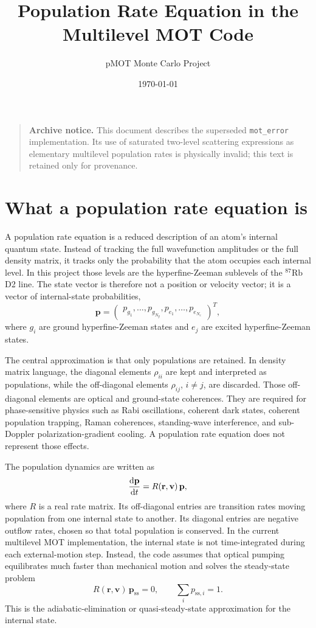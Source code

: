 \documentclass[11pt]{article}
\title{Population Rate Equation in the Multilevel MOT Code}
\author{pMOT Monte Carlo Project}
\date{\today}
\begin{document}
\maketitle

\begin{quote}
\textbf{Archive notice.} This document describes the superseded
\texttt{mot\_error} implementation. Its use of saturated two-level scattering
expressions as elementary multilevel population rates is physically invalid;
this text is retained only for provenance.
\end{quote}

\section{What a population rate equation is}

A population rate equation is a reduced description of an atom's internal
quantum state.  Instead of tracking the full wavefunction amplitudes or the
full density matrix, it tracks only the probability that the atom occupies each
internal level.  In this project those levels are the hyperfine-Zeeman sublevels
of the \({}^{87}\mathrm{Rb}\) D2 line.  The state vector is therefore not a
position or velocity vector; it is a vector of internal-state probabilities,
\[
    \mathbf p =
    \begin{pmatrix}
    p_{g_1}, \ldots, p_{g_{N_g}},
    p_{e_1}, \ldots, p_{e_{N_e}}
    \end{pmatrix}^{T},
\]
where \(g_i\) are ground hyperfine-Zeeman states and \(e_j\) are excited
hyperfine-Zeeman states.

The central approximation is that only populations are retained.  In density
matrix language, the diagonal elements \(\rho_{ii}\) are kept and interpreted
as populations, while the off-diagonal elements \(\rho_{ij}\), \(i\ne j\), are
discarded.  Those off-diagonal elements are optical and ground-state
coherences.  They are required for phase-sensitive physics such as Rabi
oscillations, coherent dark states, coherent population trapping, Raman
coherences, standing-wave interference, and sub-Doppler polarization-gradient
cooling.  A population rate equation does not represent those effects.

The population dynamics are written as
\[
    \dv{\mathbf p}{t} = R(\mathbf r,\mathbf v)\,\mathbf p,
\]
where \(R\) is a real rate matrix.  Its off-diagonal entries are transition
rates moving population from one internal state to another.  Its diagonal
entries are negative outflow rates, chosen so that total population is
conserved.  In the current multilevel MOT implementation, the internal state is
not time-integrated during each external-motion step.  Instead, the code assumes
that optical pumping equilibrates much faster than mechanical motion and solves
the steady-state problem
\[
    R(\mathbf r,\mathbf v)\,\mathbf p_{\mathrm{ss}} = 0,
    \qquad
    \sum_i p_{\mathrm{ss},i}=1.
\]
This is the adiabatic-elimination or quasi-steady-state approximation for the
internal state.
\end{document}
